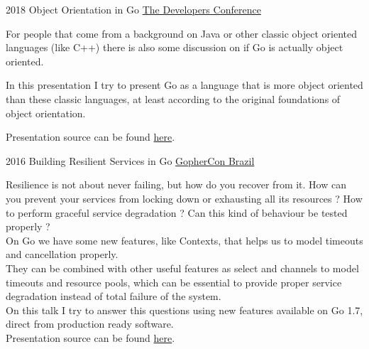\documentclass[]{friggeri-cv} %
\begin{document}
\begin{entrylist}
\entry
{2018}
{Object Orientation in Go}
{\href{http://www.thedevelopersconference.com.br/tdc/2018/florianopolis/trilha-golang}{The Developers Conference}}
{

For people that come from a background on Java or other classic object oriented languages
(like C++) there is also some discussion on if Go is actually object oriented.

In this presentation I try to present Go as a language that is more object oriented than these
classic languages, at least according to the original foundations of object orientation.

Presentation source can be found \href{https://github.com/katcipis/my.presentations/blob/master/gooo/gooo.slide}{here}.

}
\end{entrylist}

\begin{entrylist}
\entry
{2016}
{Building Resilient Services in Go}
{\href{https://2016.gopherconbr.org/en/}{GopherCon Brazil}}
{

Resilience is not about never failing, but how do you recover from it.
How can you prevent your services from locking down or exhausting all its resources ?
How to perform graceful service degradation ? Can this kind of behaviour be tested properly ?\\

On Go we have some new features, like Contexts, that helps us to model timeouts and cancellation properly.\\

They can be combined with other useful features as select and channels to model timeouts and resource pools,
which can be essential to provide proper service degradation instead of total failure of the system.\\

On this talk I try to answer this questions using new features available on Go 1.7, direct from production ready software.\\

Presentation source can be found \href{https://github.com/katcipis/my.presentations/tree/master/resilient-services-in-go}{here}.

}
\end{entrylist}
\end{document}
